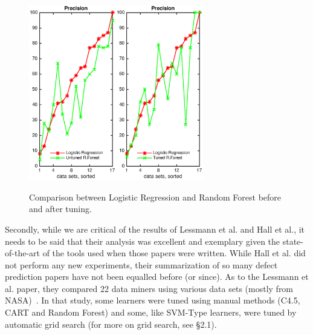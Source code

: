 \documentclass[smallextended]{svjour3}
\begin{document}
\begin{figure}[!t]
\includegraphics[width=1.5in]{./eps/LR_untuned.eps}\includegraphics[width=1.5in]{./eps/LR_tuned.eps}
\caption{Comparison between Logistic Regression and Random Forest before and after tuning. }\label{fig:lr}
 \end{figure}
 
Secondly, while we are critical of the results of
Lessmann et al. and Hall et al., it needs to be said that  their analysis  was 
excellent and exemplary given the state-of-the-art of the tools used when those papers were written.  
While Hall et al. did not perform any new experiments, 
their
summarization of so many defect prediction papers have not been equalled
before (or since).
As to the Lessmann et al. paper, they  compared
22 data miners using various   data sets (mostly from NASA)~\cite{lessmann2008benchmarking}.
In that study, some learners were tuned using manual methods 
(C4.5, CART and Random Forest)
and some, like SVM-Type learners, were tuned by automatic grid search (for more on grid search, see   {\S}2.1).
\end{document}
